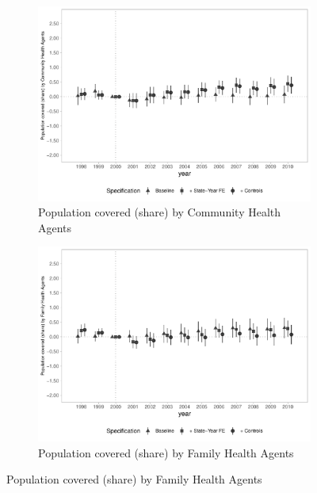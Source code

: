 \begin{figure}[h]
    \begin{center}
    \caption{Causal Effects on Primary Care Coverage - Extensive Margin}\label{fig:access1}
    \begin{subfigure}{0.32\textwidth}
        \caption{\scriptsize Population covered (share) by Community Health Agents}\label{fig:access1_a}
        \centering
        \includegraphics[width=\textwidth]{plots/access/ACS_popprop_dist_ec29_baseline_dist_ec29_baseline_full.pdf}
    \end{subfigure}
    \begin{subfigure}{0.32\textwidth}
        \centering
        \caption{\scriptsize Population covered (share) by Family Health Agents}\label{fig:iaccess1_b}
        \includegraphics[width=\textwidth]{plots/access/eSF_popprop_dist_ec29_baseline_dist_ec29_baseline_full.pdf}

\end{subfigure}
\end{center}
\end{figure}
